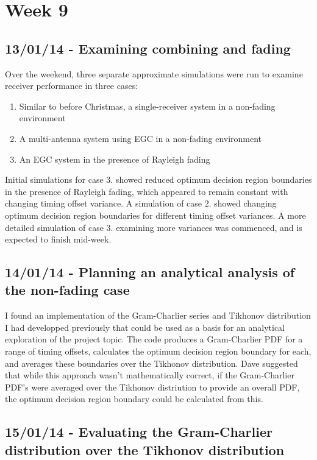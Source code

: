 \section{Week 9}

\subsection{13/01/14 - Examining combining and fading}

Over the weekend, three separate approximate simulations were run to
examine receiver performance in three cases:

\begin{enumerate}
\def\labelenumi{\arabic{enumi}.}
\itemsep1pt\parskip0pt
\item
  Similar to before Christmas, a single-receiver system in a non-fading
  environment
\item
  A multi-antenna system using EGC in a non-fading environment
\item
  An EGC system in the presence of Rayleigh fading
\end{enumerate}

Initial simulations for case 3. showed reduced optimum decision region
boundaries in the presence of Rayleigh fading, which appeared to remain
constant with changing timing offset variance. A simulation of case 2.
showed changing optimum decision region boundaries for different timing
offset variances. A more detailed simulation of case 3. examining more
variances was commenced, and is expected to finish mid-week.

\subsection{14/01/14 - Planning an analytical analysis of the non-fading
case}

I found an implementation of the Gram-Charlier series and Tikhonov
distribution I had developped previously that could be used as a basis
for an analytical exploration of the project topic. The code produces a
Gram-Charlier PDF for a range of timing offsets, calculates the optimum
decision region boundary for each, and averages these boundaries over
the Tikhonov distribution. Dave suggested that while this approach
wasn't mathematically correct, if the Gram-Charlier PDF's were averaged
over the Tikhonov distriution to provide an overall PDF, the optimum
decision region boundary could be calculated from this.

\subsection{15/01/14 - Evaluating the Gram-Charlier distribution over
the Tikhonov distribution}

